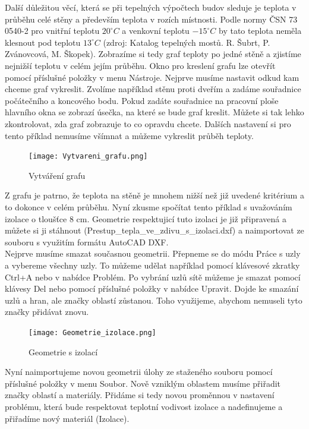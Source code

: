 \documentclass[a4paper, oneside]{article}
\begin{document}
	Další důležitou věcí, která se při tepelných výpočtech budov sleduje je teplota v průběhu celé stěny a především teplota v rozích místnosti. Podle normy ČSN 73 0540-2 pro vnitřní teplotu $20 ^\circ C$ a venkovní teplotu $-15 ^\circ C$ by tato teplota neměla klesnout pod teplotu $13 ^\circ C$ (zdroj: Katalog tepelných mostů. R. Šubrt, P. Zvánovcová, M. Škopek). Zobrazíme si tedy graf teploty po jedné stěně a zjistíme nejnižší teplotu v celém jejím průběhu. Okno pro kreslení grafu lze otevřít pomocí příslušné položky v menu Nástroje. Nejprve musíme nastavit odkud kam chceme graf vykreslit. Zvolíme například stěnu proti dveřím a zadáme souřadnice počátečního a koncového bodu. Pokud zadáte souřadnice na pracovní ploše hlavního okna se zobrazí úsečka, na které se bude graf kreslit. Můžete si tak lehko zkontrolovat, zda graf zobrazuje to co opravdu chcete. Dalších nastavení si pro tento příklad nemusíme všímnat a můžeme vykreslit průběh teploty.\\
	
\begin{figure}[htbp]
\centering
\texttt{[image: Vytvareni\_grafu.png]}\\
\caption{Vytváření grafu}
\end{figure}

	Z grafu je patrno, že teplota na stěně je mnohem nižší než již uvedené kritérium a to dokonce v celém průběhu. Nyní zkusme spočítat tento příklad s uvažováním izolace o tloušťce 8 cm. Geometrie respektujicí tuto izolaci je již připravená a můžete si ji stáhnout (Prestup\_tepla\_ve\_zdivu\_s\_izolaci.dxf) a naimportovat ze souboru s využitím formátu AutoCAD DXF.\\
	
	Nejprve musíme smazat současnou geometrii. Přepneme se do módu Práce s uzly a vybereme všechny uzly. To můžeme udělat například pomocí klávesové zkratky Ctrl+A nebo v nabídce Problém. Po vybrání uzlů sítě můžeme je smazat pomocí klávesy Del nebo pomocí příslušné položky v nabídce Upravit. Dojde ke smazání uzlů a hran, ale značky oblastí zůstanou. Toho využijeme, abychom nemuseli tyto značky přidávat znovu.\\
	
\begin{figure}[htbp]
\centering
\texttt{[image: Geometrie\_izolace.png]}\\
\caption{Geometrie s izolací}
\end{figure}

	Nyní naimportujeme novou geometrii úlohy ze staženého souboru pomocí příslušné položky v menu Soubor. Nově vzniklým oblastem musíme přiřadit značky oblastí a materiály. Přidáme si tedy novou proměnnou v nastavení problému, která bude respektovat teplotní vodivost izolace a nadefinujeme a přiřadíme nový materiál (Izolace).\\
	
\end{document}
